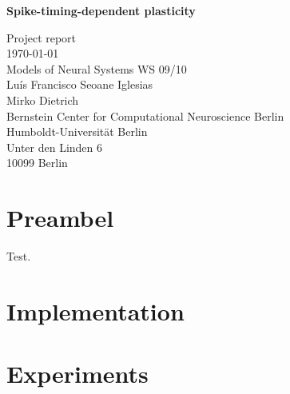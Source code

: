 \documentclass[a4paper,12pt,oneside]{article}
\begin{document}
\begin{titlepage}
\begin{center}
\begin{spacing}{2}
{\huge\bf Spike-timing-dependent plasticity} \\
\end{spacing}
\Large
Project report \\
\vfill
\normalsize
\today \\
\vspace{5em}
Models of Neural Systems WS 09/10 \\
\vspace{1em}
Luís Francisco Seoane Iglesias \\
Mirko Dietrich \\
\vspace{1em}
Bernstein Center for Computational Neuroscience Berlin \\
Humboldt-Universität Berlin \\
Unter den Linden 6 \\
10099 Berlin
\end{center}
\end{titlepage}

\tableofcontents

\newpage

\section{Preambel}

Test\cite{Song:2000}.

\section{Implementation}

\section{Experiments}

\newpage



\end{document}
